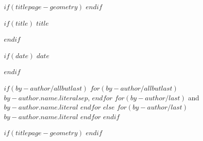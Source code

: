
$if(titlepage-geometry)$
$endif$
\begin{minipage}[b][\textheight][s]{\textwidth}
\raggedright

$if(title)$
{\huge\bfseries $title$}\par\vspace{1.5\baselineskip}
$endif$

$if(date)$
{\large $date$}\par\vspace{1.5\baselineskip}
$endif$

$if(by-author/allbutlast)$
$for(by-author/allbutlast)$
 {\large $by-author.name.literal$}$sep$, 
$endfor$
$for(by-author/last)$
 { and \large $by-author.name.literal$}
$endfor$
$else$
$for(by-author/last)$
{\large $by-author.name.literal$}
$endfor$
$endif$

\vspace{2\baselineskip}

\end{minipage}
$if(titlepage-geometry)$
\restoregeometry
$endif$